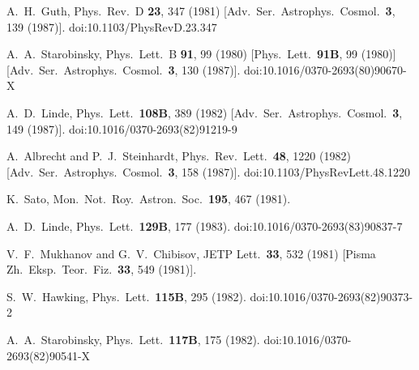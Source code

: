 \documentclass[12pt]{article}
\begin{document}
\begin{thebibliography}{99}
  A.~H.~Guth,
  Phys.\ Rev.\ D {\bf 23}, 347 (1981)
  [Adv.\ Ser.\ Astrophys.\ Cosmol.\  {\bf 3}, 139 (1987)].
  doi:10.1103/PhysRevD.23.347

  A.~A.~Starobinsky,
  Phys.\ Lett.\ B {\bf 91}, 99 (1980)
  [Phys.\ Lett.\  {\bf 91B}, 99 (1980)]
  [Adv.\ Ser.\ Astrophys.\ Cosmol.\  {\bf 3}, 130 (1987)].
  doi:10.1016/0370-2693(80)90670-X

  A.~D.~Linde,
  Phys.\ Lett.\  {\bf 108B}, 389 (1982)
  [Adv.\ Ser.\ Astrophys.\ Cosmol.\  {\bf 3}, 149 (1987)].
  doi:10.1016/0370-2693(82)91219-9

  A.~Albrecht and P.~J.~Steinhardt,
  Phys.\ Rev.\ Lett.\  {\bf 48}, 1220 (1982)
  [Adv.\ Ser.\ Astrophys.\ Cosmol.\  {\bf 3}, 158 (1987)].
  doi:10.1103/PhysRevLett.48.1220

  K.~Sato,
  Mon.\ Not.\ Roy.\ Astron.\ Soc.\  {\bf 195}, 467 (1981).

  A.~D.~Linde,
  Phys.\ Lett.\  {\bf 129B}, 177 (1983).
  doi:10.1016/0370-2693(83)90837-7

  V.~F.~Mukhanov and G.~V.~Chibisov,
  JETP Lett.\  {\bf 33}, 532 (1981)
  [Pisma Zh.\ Eksp.\ Teor.\ Fiz.\  {\bf 33}, 549 (1981)].

  S.~W.~Hawking,
  Phys.\ Lett.\  {\bf 115B}, 295 (1982).
  doi:10.1016/0370-2693(82)90373-2

  A.~A.~Starobinsky,
  Phys.\ Lett.\  {\bf 117B}, 175 (1982).
  doi:10.1016/0370-2693(82)90541-X


\end{thebibliography}
\end{document}
